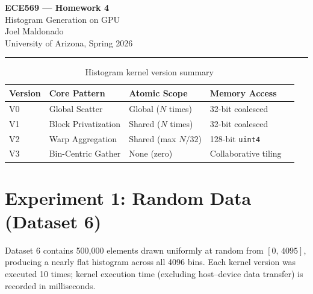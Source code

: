 \documentclass[11pt, letterpaper]{article}
\begin{document}
\begin{center}
  {\LARGE \textbf{ECE569 — Homework 4}} \\[6pt]
  {\large Histogram Generation on GPU} \\[8pt]
  Joel Maldonado \\
  University of Arizona, Spring 2026
\end{center}
\vspace{0.5em}\hrule\vspace{1.5em}

\begin{table}[H]
\centering
\caption{Histogram kernel version summary}
\label{tab:versions}
\begin{tabular}{lllll}
\toprule
\textbf{Version} & \textbf{Core Pattern} & \textbf{Atomic Scope} & \textbf{Memory Access} \\
\midrule
V0 & Global Scatter       & Global ($N$ times)       & 32-bit coalesced       \\
V1 & Block Privatization  & Shared ($N$ times)       & 32-bit coalesced       \\
V2 & Warp Aggregation     & Shared (max $N/32$)      & 128-bit \texttt{uint4} \\
V3 & Bin-Centric Gather   & None (zero)              & Collaborative tiling   \\
\bottomrule
\end{tabular}
\end{table}

\section{Experiment 1: Random Data (Dataset 6)}

Dataset 6 contains 500{,}000 elements drawn uniformly at random from
$[0,\,4095]$, producing a nearly flat histogram across all 4096 bins.
Each kernel version was executed 10 times; kernel execution time
(excluding host--device data transfer) is recorded in milliseconds.
\end{document}

